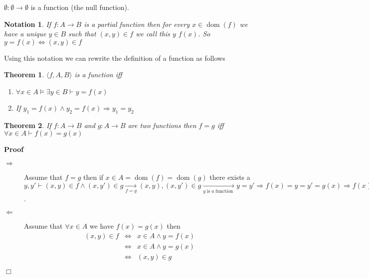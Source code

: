 \documentclass{book}
\newcommand{\Rightarrowlim}{\mathop{\rightarrow}\limits}
\newcommand{\tmop}[1]{\ensuremath{\operatorname{#1}}}
\newenvironment{proof}{\noindent\textbf{Proof\ }}{\hspace*{\fill}$\Box$\medskip}
\newtheorem{notation}{Notation}
{\theorembodyfont{\rmfamily}\newtheorem{note}{Note}}
\newtheorem{theorem}{Theorem}
\begin{document}
{{\begin{example}
  $\emptyset : \emptyset \rightarrow \emptyset$ is a function (the null
  function).
\end{example}

\begin{notation}
  If $f : A \rightarrow B$ is a partial function then for every $x \in
  \tmop{dom} (f)$ we have a unique $y \in B$ such that $(x, y) \in f$ we call
  this $y$ $f (x)$. So $y = f (x) \Leftrightarrow (x, y) \in f$
\end{notation}

Using this notation we can rewrite the definition of a function as follows

\begin{theorem}
  \label{alternative definition of a function}$\langle f, A, B \rangle$ is a
  function iff
  \begin{enumerate}
    \item $\forall x \in A \vDash \exists y \in B \vdash y = f (x)$
    
    \item If $y_1 = f (x) \wedge y_2 = f (x) \Rightarrow y_1 = y_2$
  \end{enumerate}
\end{theorem}

\begin{theorem}
  \label{condition for equality of functions}If $f : A \rightarrow B$ and $g :
  A \rightarrow B$ are two functions then $f = g$ iff $\forall x \in A \vdash
  f (x) = g (x)$
\end{theorem}

\begin{proof}
  
  \begin{description}
    \item[$\Rightarrow$] Assume that $f = g$ then if $x \in A = \tmop{dom} (f)
    = \tmop{dom} (g)$ there exists a $y, y' \vdash (x, y) \in f \wedge (x, y')
    \in g \Rightarrowlim_{f = g} (x, y), (x, y') \in g \Rightarrowlim_{g
    \tmop{is} a \tmop{function}} y = y' \Rightarrow f (x) = y = y' = g (x)
    \Rightarrow f (x) = g (x)$.
    
    \item[$\Leftarrow$] Assume that $\forall x \in A$ we have $f (x) = g (x)$
    then
    \begin{eqnarray*}
      (x, y) \in f & \Leftrightarrow & x \in A \wedge y = f (x)\\
      & \Leftrightarrow & x \in A \wedge y = g (x)\\
      & \Leftrightarrow & (x, y) \in g
    \end{eqnarray*}
  \end{description}
\end{proof}

}}
\end{document}
